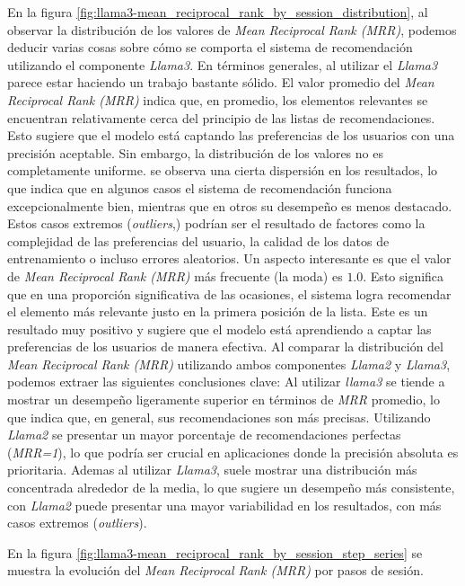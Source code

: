 \documentclass[11pt,a4paper,twoside]{thesis}
\begin{document}
En la figura \ref{fig:llama3-mean_reciprocal_rank_by_session_distribution}, al observar la distribución de los valores de \textit{Mean Reciprocal Rank (MRR)}, podemos deducir varias cosas sobre cómo se comporta el sistema de recomendación utilizando el componente \textit{Llama3}. En términos generales, al utilizar el \textit{Llama3} parece estar haciendo un trabajo bastante sólido. El valor promedio del \textit{Mean Reciprocal Rank (MRR)} indica que, en promedio, los elementos relevantes se encuentran relativamente cerca del principio de las listas de recomendaciones. Esto sugiere que el modelo está captando las preferencias de los usuarios con una precisión aceptable.
Sin embargo, la distribución de los valores no es completamente uniforme. se observa una cierta dispersión en los resultados, lo que indica que en algunos casos el sistema de recomendación funciona excepcionalmente bien, mientras que en otros su desempeño es menos destacado. Estos casos extremos (\textit{outliers},) podrían ser el resultado de factores como la complejidad de las preferencias del usuario, la calidad de los datos de entrenamiento o incluso errores aleatorios.
Un aspecto interesante es que el valor de \textit{Mean Reciprocal Rank (MRR)} más frecuente (la moda) es $1.0$. Esto significa que en una proporción significativa de las ocasiones, el sistema logra recomendar el elemento más relevante justo en la primera posición de la lista. Este es un resultado muy positivo y sugiere que el modelo está aprendiendo a captar las preferencias de los usuarios de manera efectiva.
Al comparar la distribución del \textit{Mean Reciprocal Rank (MRR)} utilizando ambos componentes \textit{Llama2} y \textit{Llama3}, podemos extraer las siguientes conclusiones clave: Al utilizar \textit{llama3} se tiende a mostrar un desempeño ligeramente superior en términos de \textit{MRR} promedio, lo que indica que, en general, sus recomendaciones son más precisas.
Utilizando \textit{Llama2} se presentar un mayor porcentaje de recomendaciones perfectas (\textit{MRR=1}), lo que podría ser crucial en aplicaciones donde la precisión absoluta es prioritaria. Ademas al utilizar \textit{Llama3}, suele mostrar una distribución más concentrada alrededor de la media, lo que sugiere un desempeño más consistente, con \textit{Llama2} puede presentar una mayor variabilidad en los resultados, con más casos extremos (\textit{outliers}).


\clearpage

En la figura \ref{fig:llama3-mean_reciprocal_rank_by_session_step_series} se muestra la evolución del \textit{Mean Reciprocal Rank (MRR)} por pasos de sesión.
\end{document}
